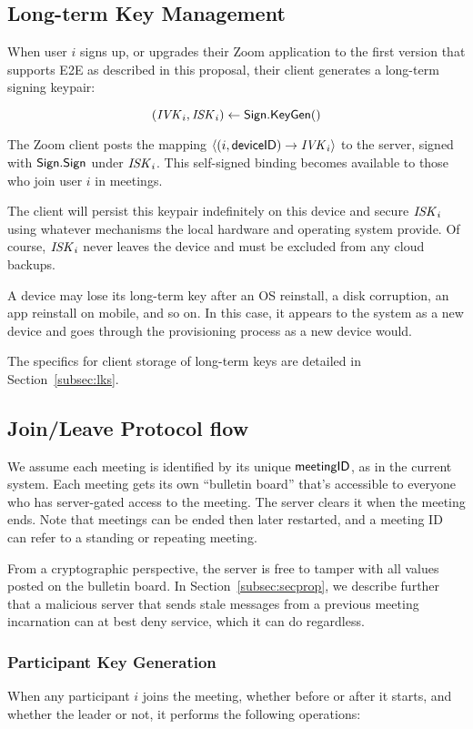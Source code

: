 \subsection{Long-term Key Management}

When user $i$ signs up, or upgrades their Zoom application to the first version that supports E2E as described in this proposal, their client generates a long-term signing keypair:

\[
(\mathit{IVK}_i, \mathit{ISK}_i) \leftarrow {\sf Sign}.\mathsf{KeyGen}()
\]

The Zoom client posts the mapping $\langle (i, {\sf deviceID}) \rightarrow \mathit{IVK}_i \rangle$ to the server, signed with ${\sf Sign}.\mathsf{Sign}$ under $\mathit{ISK}_i$. This self-signed binding becomes available to those who join user $i$ in meetings.

The client will persist this keypair indefinitely on this device and secure $\mathit{ISK}_i$ using whatever mechanisms the local hardware and operating system provide. Of course, $\mathit{ISK}_i$ never leaves the device and must be excluded from any cloud backups.

A device may lose its long-term key after an OS reinstall, a disk corruption, an app reinstall on mobile, and so on. In this case, it appears to the system as a new device and goes through the provisioning process as a new device would.

The specifics for client storage of long-term keys are detailed in Section~\ref{subsec:lks}.

\subsection{Join/Leave Protocol flow}
We assume each meeting is identified by its unique ${\sf meetingID}$, as in the current system. Each meeting gets its own ``bulletin board'' that's accessible to everyone who has server-gated access to the meeting. The server clears it when the meeting ends. Note that meetings can be ended then later restarted, and a meeting ID can refer to a standing or repeating meeting.

From a cryptographic perspective, the server is free to tamper with all values posted on the bulletin board. In Section~\ref{subsec:secprop}, we describe further that a malicious server that sends stale messages from a previous meeting incarnation can at best deny service, which it can do regardless.

\subsubsection{Participant Key Generation}
When any participant $i$ joins the meeting, whether before or after it starts, and whether the leader or not, it performs the following operations:

